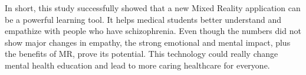 In short, this study successfully showed that a new Mixed Reality application can be a powerful learning tool. It helps medical students better understand and empathize with people who have schizophrenia. Even though the numbers did not show major changes in empathy, the strong emotional and mental impact, plus the benefits of MR, prove its potential. This technology could really change mental health education and lead to more caring healthcare for everyone.
